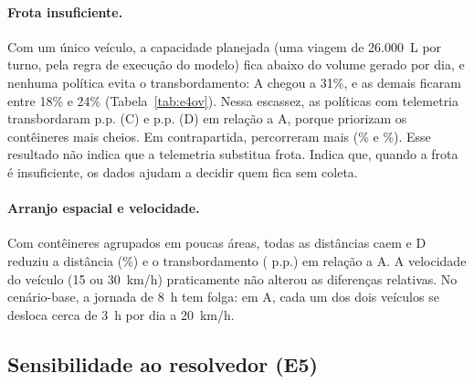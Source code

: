 \paragraph{Frota insuficiente.}
Com um único veículo, a capacidade planejada (uma viagem de
26.000~L por turno, pela regra de execução do modelo) fica abaixo do
volume gerado por dia, e nenhuma política evita o transbordamento: A chegou a
31\%, e as demais ficaram entre 18\% e 24\% (Tabela~\ref{tab:e4ov}). Nessa
escassez, as políticas com telemetria transbordaram
\DifEQFrotaReduzidaCvsAOv{} p.p. (C) e \DifEQFrotaReduzidaDvsAOv{} p.p. (D)
em relação a A, porque priorizam os contêineres mais cheios. Em
contrapartida, percorreram mais (\RelEQFrotaReduzidaCvsAKm\% e
\RelEQFrotaReduzidaDvsAKm\%). Esse
resultado não indica que a telemetria substitua frota. Indica que, quando a
frota é insuficiente, os dados ajudam a decidir quem fica sem coleta.

\paragraph{Arranjo espacial e velocidade.}
Com contêineres agrupados em poucas áreas, todas as distâncias caem e D
reduziu a distância (\RelEQLayoutAgrupadoDvsAKm\%) e o transbordamento
(\DifEQLayoutAgrupadoDvsAOv{} p.p.) em relação a A. A velocidade do veículo
(15 ou 30~km/h) praticamente não alterou as diferenças relativas. No
cenário-base, a jornada de 8~h tem folga: em A, cada um dos dois veículos se
desloca cerca de 3~h por dia a 20~km/h.

\begin{table}[ht]
\centering
\caption{E4 -- comparações pareadas de km/dia por condição (alternativa $-$ referência; 30 pares; Holm na família E4/km).}
\label{tab:e4km}
\scriptsize
\resizebox{\textwidth}{!}{}
\end{table}

\begin{table}[ht]
\centering
\caption{E4 -- comparações pareadas de transbordamento (p.p. do volume gerado; Holm na família E4/transbordamento).}
\label{tab:e4ov}
\scriptsize
\resizebox{\textwidth}{!}{}
\end{table}

\subsection{Sensibilidade ao resolvedor (E5)}\label{sec:e5}

